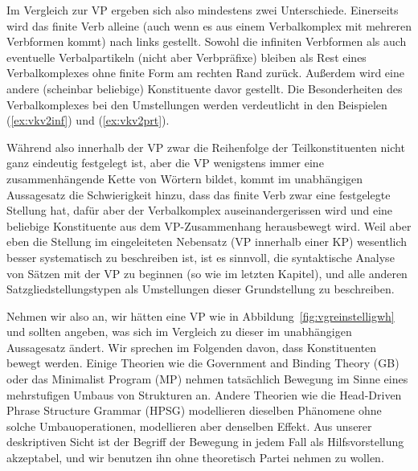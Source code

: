 Im Vergleich zur VP ergeben sich also mindestens zwei Unterschiede.
Einerseits wird das finite Verb alleine (auch wenn es aus einem Verbalkomplex mit mehreren Verbformen kommt) nach links gestellt.
Sowohl die infiniten Verbformen als auch eventuelle Verbalpartikeln (nicht aber Verbpräfixe) bleiben als Rest eines Verbalkomplexes ohne finite Form am rechten Rand zurück.
Außerdem wird eine andere (scheinbar beliebige) Konstituente davor gestellt.
Die Besonderheiten des Verbalkomplexes bei den Umstellungen werden verdeutlicht in den Beispielen (\ref{ex:vkv2inf}) und (\ref{ex:vkv2prt}).

\begin{exe}
  \ex\label{ex:vkv2inf}
  \begin{xlist}
  \end{xlist}
  \ex\label{ex:vkv2prt}
  \begin{xlist}
  \end{xlist}
\end{exe}


Während also innerhalb der VP zwar die Reihenfolge der Teilkonstituenten nicht ganz eindeutig festgelegt ist, aber die VP wenigstens immer eine zusammenhängende Kette von Wörtern bildet, kommt im unabhängigen Aussagesatz die Schwierigkeit hinzu, dass das finite Verb zwar eine festgelegte Stellung hat, dafür aber der Verbalkomplex auseinandergerissen wird und eine beliebige Konstituente aus dem VP-Zusammenhang herausbewegt wird.
Weil aber eben die Stellung im eingeleiteten Nebensatz (VP innerhalb einer KP) wesentlich besser systematisch zu beschreiben ist, ist es sinnvoll, die syntaktische Analyse von Sätzen mit der VP zu beginnen (so wie im letzten Kapitel), und alle anderen Satzgliedstellungstypen als Umstellungen dieser Grundstellung zu beschreiben.

Nehmen wir also an, wir hätten eine VP wie in Abbildung~\ref{fig:vgreinstelligwh} und sollten angeben, was sich im Vergleich zu dieser im unabhängigen Aussagesatz ändert.
Wir sprechen im Folgenden davon, dass Konstituenten bewegt werden.
Einige Theorien wie \zB die Government and Binding Theory (GB) oder das Minimalist Program (MP) nehmen tatsächlich Bewegung im Sinne eines mehrstufigen Umbaus von Strukturen an.
Andere Theorien wie die Head-Driven Phrase Structure Grammar (HPSG) modellieren dieselben Phänomene ohne solche Umbauoperationen, modellieren aber denselben Effekt.
Aus unserer deskriptiven Sicht ist der Begriff der Bewegung in jedem Fall als Hilfsvorstellung akzeptabel, und wir benutzen ihn ohne theoretisch Partei nehmen zu wollen.

